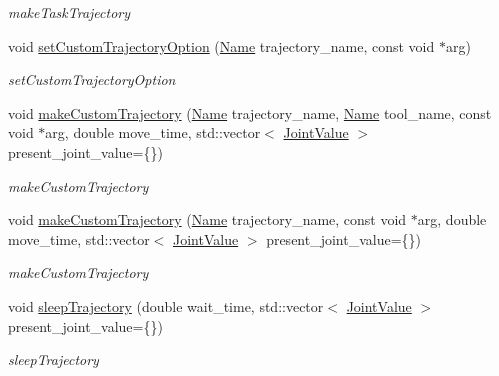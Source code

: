 \begin{DoxyCompactItemize}
\begin{DoxyCompactList}\small\item\em make\+Task\+Trajectory \end{DoxyCompactList}\item 
void \hyperlink{classrobotis__manipulator_1_1_robotis_manipulator_abd3a5c412832dd7e6a54fb6d19a0b066}{set\+Custom\+Trajectory\+Option} (\hyperlink{namespacerobotis__manipulator_a08c2d25e77a01ad75b9bb740f8ce4765}{Name} trajectory\+\_\+name, const void $\ast$arg)
\begin{DoxyCompactList}\small\item\em set\+Custom\+Trajectory\+Option \end{DoxyCompactList}\item 
void \hyperlink{classrobotis__manipulator_1_1_robotis_manipulator_af1989fd3e2afa8d4b12e05d63070201e}{make\+Custom\+Trajectory} (\hyperlink{namespacerobotis__manipulator_a08c2d25e77a01ad75b9bb740f8ce4765}{Name} trajectory\+\_\+name, \hyperlink{namespacerobotis__manipulator_a08c2d25e77a01ad75b9bb740f8ce4765}{Name} tool\+\_\+name, const void $\ast$arg, double move\+\_\+time, std\+::vector$<$ \hyperlink{namespacerobotis__manipulator_aa0556c98c5294ccf3a96c2d0fe315e40}{Joint\+Value} $>$ present\+\_\+joint\+\_\+value=\{\})
\begin{DoxyCompactList}\small\item\em make\+Custom\+Trajectory \end{DoxyCompactList}\item 
void \hyperlink{classrobotis__manipulator_1_1_robotis_manipulator_a0e1f07736f4fd027317f037553b2ed21}{make\+Custom\+Trajectory} (\hyperlink{namespacerobotis__manipulator_a08c2d25e77a01ad75b9bb740f8ce4765}{Name} trajectory\+\_\+name, const void $\ast$arg, double move\+\_\+time, std\+::vector$<$ \hyperlink{namespacerobotis__manipulator_aa0556c98c5294ccf3a96c2d0fe315e40}{Joint\+Value} $>$ present\+\_\+joint\+\_\+value=\{\})
\begin{DoxyCompactList}\small\item\em make\+Custom\+Trajectory \end{DoxyCompactList}\item 
void \hyperlink{classrobotis__manipulator_1_1_robotis_manipulator_aae0261b006df2076d8843b2afde97b7d}{sleep\+Trajectory} (double wait\+\_\+time, std\+::vector$<$ \hyperlink{namespacerobotis__manipulator_aa0556c98c5294ccf3a96c2d0fe315e40}{Joint\+Value} $>$ present\+\_\+joint\+\_\+value=\{\})
\begin{DoxyCompactList}\small\item\em sleep\+Trajectory \end{DoxyCompactList}\item 

\end{DoxyCompactItemize}
